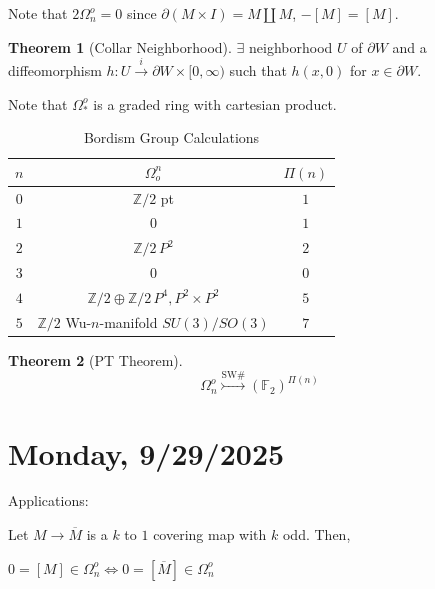 \documentclass{article}
\theoremstyle{definition}
\newtheorem{theorem}{Theorem}
\begin{document}
    Note that \(2 \Omega^o_n = 0\) since \(\partial (M \times I) = M \coprod M\), \(-[M] = [M]\).

    \begin{theorem}
        [Collar Neighborhood] \(\exists\) neighborhood \(U\) of \(\partial W\) and a diffeomorphism \(h: U \xrightarrow{i} \partial W \times [0,\infty)\) such that \(h(x,0)\) for \(x\in \partial W\).
    \end{theorem}

    Note that \(\Omega^o_{\ast}\) is a graded ring with cartesian product.

    \begin{table}[H]
        \centering
        \begin{tabular}{c|c|c}
            \toprule
                \(n\) & \(\Omega^n_o\) & \(\Pi(n)\) \\
            \midrule
                \(0\) & \(\mathbb{Z} / 2\) pt & \(1\) \\
                \(1\) & \(0\) & \(1\) \\
                \(2\) & \(\mathbb{Z}/2\, P^2\) & \(2\) \\
                \(3\) & \(0\) & \(0\) \\
                \(4\) & \(\mathbb{Z}/2 \oplus \mathbb{Z}/2\, P^4, P^2 \times P^2\) & \(5\) \\
                \(5\) & \(\mathbb{Z} / 2\) Wu-\(n\)-manifold \(SU(3) / SO(3)\) & \(7\) \\
            \bottomrule
        \end{tabular}
        \caption{Bordism Group Calculations}
    \end{table}

    \begin{theorem}
        [PT Theorem]

        \[
            \Omega^o_n \overset{\text{SW\#}}{\rightarrowtail} (\mathbb{F}_2)^{\Pi(n)}
        \]
    \end{theorem}

    \section*{Monday, 9/29/2025}
    
    Applications:

    Let \(M \to \overline{M}\) is a \(k\) to \(1\) covering map with \(k\) odd. Then,

    \(0 = [M]\in \Omega^o_n \iff 0 = [\overline{M}] \in \Omega^o_n\) 
\end{document}
